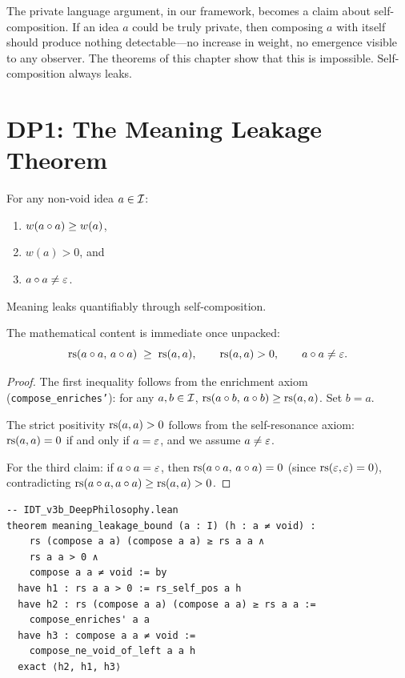 The private language argument, in our framework, becomes a claim about
self-composition. If an idea $a$ could be truly private, then composing
$a$ with itself should produce nothing detectable---no increase in weight,
no emergence visible to any observer. The theorems of this chapter show
that this is impossible. Self-composition always leaks.

\section{DP1: The Meaning Leakage Theorem}

\begin{theorem}
\label{thm:meaning-leakage}
For any non-void idea $a \in \mathcal{I}$:
\begin{enumerate}
\item $w(a \circ a) \geq w(a)$,
\item $w(a) > 0$, and
\item $a \circ a \neq \varepsilon$.
\end{enumerate}
Meaning leaks quantifiably through self-composition.
\end{theorem}

The mathematical content is immediate once unpacked:
\[
\mathrm{rs}(a \circ a,\, a \circ a) \;\geq\; \mathrm{rs}(a, a), \qquad
\mathrm{rs}(a, a) > 0, \qquad
a \circ a \neq \varepsilon.
\]

\begin{proof}
The first inequality follows from the enrichment axiom
(\texttt{compose\_enriches'}): for any $a, b \in \mathcal{I}$,
$\mathrm{rs}(a \circ b,\, a \circ b) \geq \mathrm{rs}(a, a)$.
Set $b = a$.

The strict positivity $\mathrm{rs}(a, a) > 0$ follows from the self-resonance
axiom: $\mathrm{rs}(a, a) = 0$ if and only if $a = \varepsilon$, and we assume
$a \neq \varepsilon$.

For the third claim: if $a \circ a = \varepsilon$, then
$\mathrm{rs}(a \circ a,\, a \circ a) = 0$ (since $\mathrm{rs}(\varepsilon, \varepsilon) = 0$),
contradicting $\mathrm{rs}(a \circ a, a \circ a) \geq \mathrm{rs}(a, a) > 0$.
\end{proof}

\begin{lstlisting}
-- IDT_v3b_DeepPhilosophy.lean
theorem meaning_leakage_bound (a : I) (h : a ≠ void) :
    rs (compose a a) (compose a a) ≥ rs a a ∧
    rs a a > 0 ∧
    compose a a ≠ void := by
  have h1 : rs a a > 0 := rs_self_pos a h
  have h2 : rs (compose a a) (compose a a) ≥ rs a a :=
    compose_enriches' a a
  have h3 : compose a a ≠ void :=
    compose_ne_void_of_left a a h
  exact ⟨h2, h1, h3⟩
\end{lstlisting}

